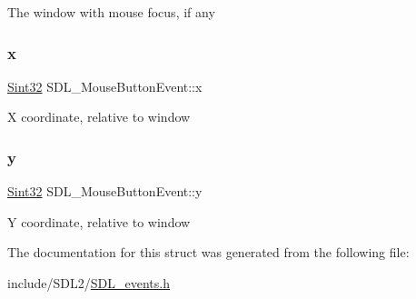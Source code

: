 The window with mouse focus, if any \mbox{\label{struct_s_d_l___mouse_button_event_a5bb9c61b86e999f58637511e32e3a076}} 
\subsubsection{\texorpdfstring{x}{x}}
{\footnotesize\ttfamily \hyperlink{_s_d_l__stdinc_8h_a7a90b941db9d4582e9ad7abb9940ff7e}{Sint32} S\+D\+L\+\_\+\+Mouse\+Button\+Event\+::x}

X coordinate, relative to window \mbox{\label{struct_s_d_l___mouse_button_event_a7ccb5c55a7ddadce723f4ea6d5269540}} 
\subsubsection{\texorpdfstring{y}{y}}
{\footnotesize\ttfamily \hyperlink{_s_d_l__stdinc_8h_a7a90b941db9d4582e9ad7abb9940ff7e}{Sint32} S\+D\+L\+\_\+\+Mouse\+Button\+Event\+::y}

Y coordinate, relative to window 

The documentation for this struct was generated from the following file\+:\begin{DoxyCompactItemize}
\item 
include/\+S\+D\+L2/\hyperlink{_s_d_l__events_8h}{S\+D\+L\+\_\+events.\+h}\end{DoxyCompactItemize}
